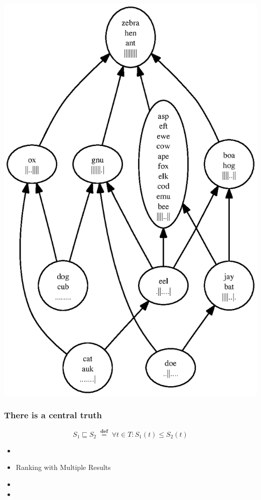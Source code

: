 \documentclass[svgnames,14pt]{beamer}
\newcommand\defined{\mathrel{\;\stackrel{\scriptscriptstyle\mathbf{def}}{=}\;}}
\theoremstyle{definition}
\begin{document}
\begin{frame}
\centerline{\includegraphics[height=\textheight]{rank1.ps}}
\end{frame}

\begin{frame}
\frametitle{There is a central truth}
\begin{block}{}
$$S_1 \sqsubseteq S_2 \defined \forall t \in T : S_1(t) \leq S_2(t)$$
\end{block}
\end{frame}

\begin{frame}
\begin{itemize}
\frametitle{Overview}
\item {}
\item Ranking with Multiple Results
\item {}
\item {}
\end{itemize}
\end{frame}
\end{document}
